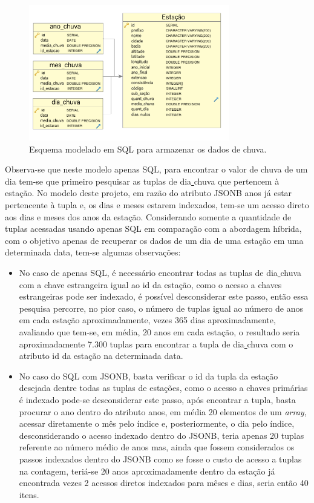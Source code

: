 \documentclass[article,11pt,oneside,a4paper]{abntex2} %
\begin{document}
	\begin{figure}[!h]
		\centering
		\includegraphics[width=0.78\textwidth]{figuras/schema_sql2}
		\caption{Esquema modelado em SQL para armazenar os dados de chuva.}
		\label{schema_sql}
	\end{figure}
	\newpage
	Observa-se que neste modelo apenas SQL, para encontrar o valor de chuva de um dia tem-se que primeiro pesquisar as tuplas de dia\underline{ }chuva que pertencem à estação. No modelo deste projeto, em razão do atributo JSONB anos já estar pertencente à tupla e, os dias e meses estarem indexados, tem-se um acesso direto aos dias e meses dos anos da estação. Considerando somente a quantidade de tuplas acessadas usando apenas SQL em comparação com a abordagem híbrida, com o objetivo apenas de recuperar os dados de um dia de uma estação em uma determinada data, tem-se algumas observações:
	
	\begin{itemize}

		\item No caso de apenas SQL, é necessário encontrar todas as tuplas de dia\underline{ }chuva com a chave estrangeira igual ao id da estação, como o acesso a chaves estrangeiras pode ser indexado, é possível desconsiderar este passo, então essa pesquisa percorre, no pior caso, o número de tuplas igual ao número de anos em cada estação aproximadamente, vezes 365 dias aproximadamente, avaliando que tem-se, em média, 20 anos em cada estação, o resultado seria aproximadamente 7.300 tuplas para encontrar a tupla de dia\underline{ }chuva com o atributo id da estação na determinada data.

		\item No caso do SQL com JSONB, basta verificar o id da tupla da estação desejada dentre todas as tuplas de estações, como o acesso a chaves primárias é indexado pode-se desconsiderar este passo, após encontrar a tupla, basta procurar o ano dentro do atributo anos, em média 20 elementos de um \textit{array}, acessar diretamente o mês pelo índice e, posteriormente, o dia pelo índice, desconsiderando o acesso indexado dentro do JSONB, teria apenas 20 tuplas referente ao número médio de anos mas, ainda que fossem considerados os passos indexados dentro do JSONB como se fosse o custo de acesso a tuplas na contagem, teriá-se 20 anos aproximadamente dentro da estação já encontrada vezes 2 acessos diretos indexados para mêses e dias, seria então 40 itens.
		
	\end{itemize}
	
\end{document}
